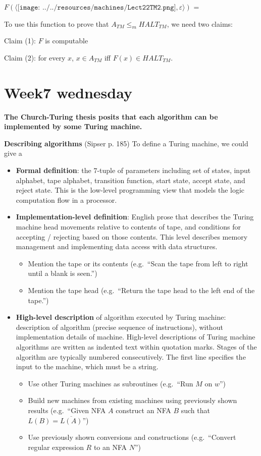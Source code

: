 \documentclass[12pt, oneside]{article}
\begin{document}
    $F( \langle \texttt{[image: ../../resources/machines/Lect22TM2.png]} ,  \varepsilon  \rangle)$ =

    To use this function  to prove that $A_{TM} \leq_m HALT_{TM}$, we need  two claims:

    
    Claim (1): $F$ is computable \phantom{\hspace{2in}}
    
    \vfill

    Claim (2): for every  $x$,  $x \in  A_{TM}$ iff $F(x) \in HALT_{TM}$.  
    
    \vfill
    \vfill
    \vfill \vfill
\section*{Week7 wednesday}


{\bf The Church-Turing thesis posits that each algorithm can be implemented by some Turing machine.}

{\bf Describing  algorithms} (Sipser p. 185) To define a Turing machine, we could give a 
\begin{itemize}
\item {\bf Formal definition}: the $7$-tuple of parameters including set of states, 
input alphabet, tape alphabet, transition function, start state, accept state, and reject state.
This is the low-level programming view that models the logic computation flow in a processor.
\item {\bf Implementation-level definition}: English prose that describes the Turing machine head 
movements relative to contents of tape, and conditions for accepting / rejecting based on those contents.
This level describes memory management and implementing data access with data structures.
  \begin{itemize}
    \item Mention the tape or its contents (e.g.\ ``Scan the tape from left to right until a blank is seen.'')
    \item Mention the tape head (e.g.\ ``Return the tape head to the left end of the tape.'')
  \end{itemize}
\item {\bf High-level description} of algorithm executed by Turing machine: 
description of algorithm (precise sequence of instructions), 
without implementation details of machine. 
High-level descriptions of  Turing machine algorithms are written as indented text within quotation marks.   
Stages of the algorithm are typically numbered consecutively.
The first line specifies the input to the machine, which must be a string.
  \begin{itemize}
    \item Use other Turing machines as subroutines (e.g.\ ``Run $M$ on $w$'')
    \item Build new machines from existing machines using previously shown results (e.g.\ 
    ``Given NFA $A$ construct an NFA $B$ such that $L(B) = \overline{L(A)}$'')
    \item Use previously shown conversions and constructions (e.g.\ ``Convert regular expression $R$ 
    to an NFA $N$'')
  \end{itemize}
\end{itemize}
\end{document}
